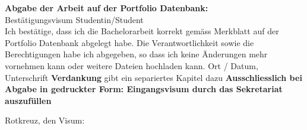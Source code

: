 \documentclass[main.tex]{subfiles} %
\begin{document}
\noindent
\textbf{Abgabe der Arbeit auf der Portfolio Datenbank:}\\
Bestätigungsvisum Studentin/Student\\
Ich bestätige, dass ich die Bachelorarbeit korrekt gemäss Merkblatt auf der Portfolio
Datenbank abgelegt habe. Die Verantwortlichkeit sowie die Berechtigungen habe ich abgegeben, so
dass ich keine Änderungen mehr vornehmen kann oder weitere Dateien hochladen kann.
\newline
\newline
Ort / Datum, Unterschrift	\underline{\hspace*{4cm}}
\newline
\newline
\newline
{\color{red} \textbf{Verdankung} gibt ein separiertes Kapitel dazu }
\newline
\newline
\noindent
{\textbf{Ausschliesslich bei Abgabe in gedruckter Form:
        Eingangsvisum durch das Sekretariat auszufüllen}}
\newline


\vspace*{2cm}
\noindent
Rotkreuz, den \underline{\hspace*{4cm}} \hspace*{4cm}
Visum: \underline{\hspace*{4cm}}
\end{document}
